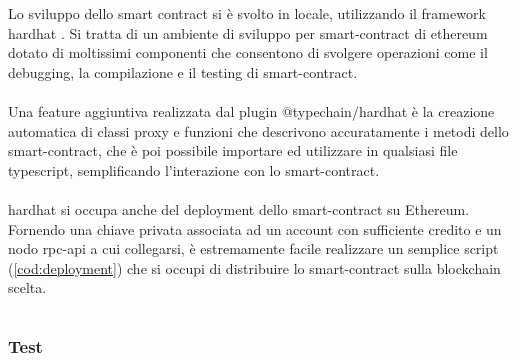 Lo sviluppo dello smart contract si è svolto in locale, utilizzando il framework hardhat \cite{soft:hardhat}.
Si tratta di un ambiente di sviluppo per \gls{smart-contract} di \gls{ethereum} dotato di moltissimi componenti
che consentono di svolgere operazioni come il debugging, la compilazione e il testing di \gls{smart-contract}. \\
\\
Una feature aggiuntiva realizzata dal plugin @typechain/hardhat \cite{soft:typechain_hardhat} è la creazione automatica di
classi proxy e funzioni che descrivono accuratamente i metodi dello \gls{smart-contract},
che è poi possibile importare ed utilizzare in qualsiasi file typescript, semplificando l'interazione con lo \gls{smart-contract}. \\
\\
hardhat si occupa anche del deployment dello \gls{smart-contract} su Ethereum. \\
Fornendo una chiave privata associata ad un account con sufficiente credito e un nodo \gls{rpc-api} a cui collegarsi,
è estremamente facile realizzare un semplice script (\autoref{cod:deployment}) che si occupi di distribuire lo \gls{smart-contract} sulla blockchain scelta.

\inputminted{typescript}{../contracts/scripts/deployExam.ts}

\subsubsection{Test}


